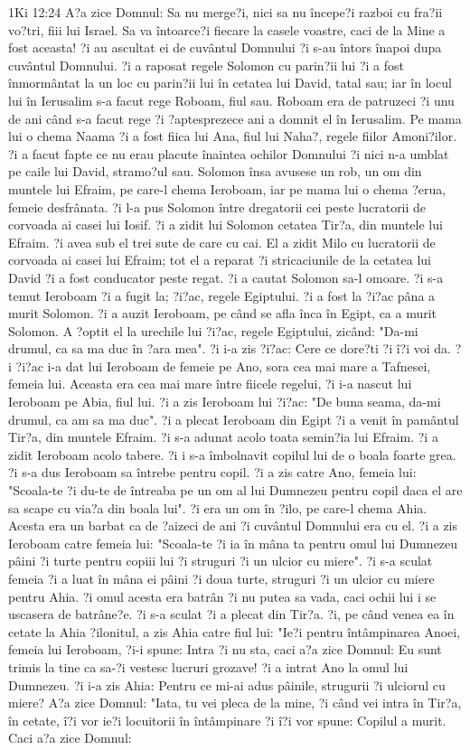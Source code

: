 1Ki 12:24  A?a zice Domnul: Sa nu merge?i, nici sa nu începe?i razboi cu fra?ii vo?tri, fiii lui Israel. Sa va întoarce?i fiecare la casele voastre, caci de la Mine a fost aceasta! ?i au ascultat ei de cuvântul Domnului ?i s-au întors înapoi dupa cuvântul Domnului. ?i a raposat regele Solomon cu parin?ii lui ?i a fost înmormântat la un loc cu parin?ii lui în cetatea lui David, tatal sau; iar în locul lui în Ierusalim s-a facut rege Roboam, fiul sau. Roboam era de patruzeci ?i unu de ani când s-a facut rege ?i ?aptesprezece ani a domnit el în Ierusalim. Pe mama lui o chema Naama ?i a fost fiica lui Ana, fiul lui Naha?, regele fiilor Amoni?ilor. ?i a facut fapte ce nu erau placute înaintea ochilor Domnului ?i nici n-a umblat pe caile lui David, stramo?ul sau. Solomon însa avusese un rob, un om din muntele lui Efraim, pe care-l chema Ieroboam, iar pe mama lui o chema ?erua, femeie desfrânata. ?i l-a pus Solomon între dregatorii cei peste lucratorii de corvoada ai casei lui Iosif. ?i a zidit lui Solomon cetatea Tir?a, din muntele lui Efraim. ?i avea sub el trei sute de care cu cai. El a zidit Milo cu lucratorii de corvoada ai casei lui Efraim; tot el a reparat ?i stricaciunile de la cetatea lui David ?i a fost conducator peste regat. ?i a cautat Solomon sa-l omoare. ?i s-a temut Ieroboam ?i a fugit la; ?i?ac, regele Egiptului. ?i a fost la ?i?ac pâna a murit Solomon. ?i a auzit Ieroboam, pe când se afla înca în Egipt, ca a murit Solomon. A ?optit el la urechile lui ?i?ac, regele Egiptului, zicând: "Da-mi drumul, ca sa ma duc în ?ara mea". ?i i-a zis ?i?ac: Cere ce dore?ti ?i î?i voi da. ?i ?i?ac i-a dat lui Ieroboam de femeie pe Ano, sora cea mai mare a Tafnesei, femeia lui. Aceasta era cea mai mare între fiicele regelui, ?i i-a nascut lui Ieroboam pe Abia, fiul lui. ?i a zis Ieroboam lui ?i?ac: "De buna seama, da-mi drumul, ca am sa ma duc". ?i a plecat Ieroboam din Egipt ?i a venit în pamântul Tir?a, din muntele Efraim. ?i s-a adunat acolo toata semin?ia lui Efraim. ?i a zidit Ieroboam acolo tabere. ?i i s-a îmbolnavit copilul lui de o boala foarte grea. ?i s-a dus Ieroboam sa întrebe pentru copil. ?i a zis catre Ano, femeia lui: "Scoala-te ?i du-te de întreaba pe un om al lui Dumnezeu pentru copil daca el are sa scape cu via?a din boala lui". ?i era un om în ?ilo, pe care-l chema Ahia. Acesta era un barbat ca de ?aizeci de ani ?i cuvântul Domnului era cu el. ?i a zis Ieroboam catre femeia lui: "Scoala-te ?i ia în mâna ta pentru omul lui Dumnezeu pâini ?i turte pentru copiii lui ?i struguri ?i un ulcior cu miere". ?i s-a sculat femeia ?i a luat în mâna ei pâini ?i doua turte, struguri ?i un ulcior cu miere pentru Ahia. ?i omul acesta era batrân ?i nu putea sa vada, caci ochii lui i se uscasera de batrâne?e. ?i s-a sculat ?i a plecat din Tir?a. ?i, pe când venea ea în cetate la Ahia ?ilonitul, a zis Ahia catre fiul lui: "Ie?i pentru întâmpinarea Anoei, femeia lui Ieroboam, ?i-i spune: Intra ?i nu sta, caci a?a zice Domnul: Eu sunt trimis la tine ca sa-?i vestesc lucruri grozave! ?i a intrat Ano la omul lui Dumnezeu. ?i i-a zis Ahia: Pentru ce mi-ai adus pâinile, strugurii ?i ulciorul cu miere? A?a zice Domnul: "Iata, tu vei pleca de la mine, ?i când vei intra în Tir?a, în cetate, î?i vor ie?i locuitorii în întâmpinare ?i î?i vor spune: Copilul a murit. Caci a?a zice Domnul: 